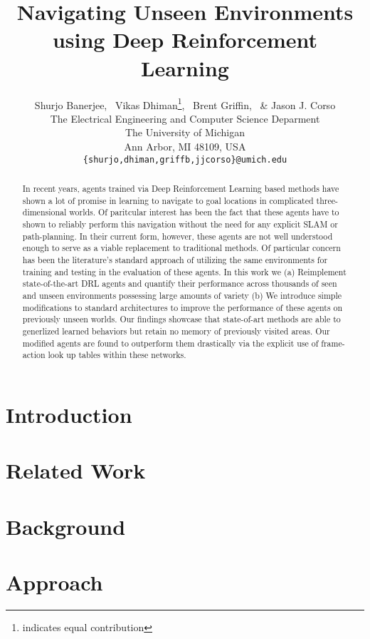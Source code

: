 \documentclass{article} %
\title{Navigating Unseen Environments using Deep Reinforcement Learning}
\author{Shurjo Banerjee\footnotemark[1],%
  \, Vikas Dhiman\thanks{indicates equal contribution},%
  \, Brent Griffin,%
  \, \& Jason J. Corso\\
  The Electrical Engineering and Computer Science Deparment\\
The University of Michigan\\
Ann Arbor, MI 48109, USA \\
\texttt{\{shurjo,dhiman,griffb,jjcorso\}@umich.edu} \\
}
\begin{document}
\maketitle

\begin{abstract}
In recent years, agents trained via Deep Reinforcement Learning based methods have shown a lot of promise in learning to navigate to goal locations in complicated three-dimensional worlds. Of paritcular interest has been the fact that these agents have to shown to reliably perform this navigation  without the need for any explicit SLAM or path-planning. In their current form, however, these agents are not well understood enough to serve as a viable replacement to traditional methods. Of particular concern has been the literature's standard approach of utilizing the same environments for training and testing in the evaluation of these agents. In this work we (a) Reimplement state-of-the-art DRL agents and quantify their performance across thousands of seen and unseen environments possessing large amounts of variety (b) We introduce simple modifications to standard architectures to improve the performance of these agents on previously unseen worlds. Our findings showcase that state-of-art methods are able to generlized learned behaviors but retain no memory of previously visited areas. Our modified agents are found to outperform them drastically via the explicit use of frame-action look up tables within these networks. 
\end{abstract}

\section{Introduction}
%



\section{Related Work}


\section{Background}


\section{Approach}

\end{document}
